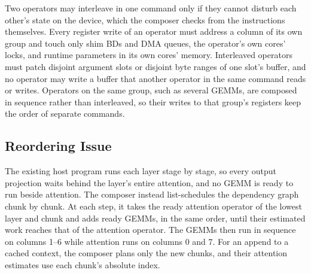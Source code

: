 Two operators may interleave in one command only if they cannot disturb each other's state on the device, which the composer checks from the instructions themselves.
Every register write of an operator must address a column of its own group and touch only shim BDs and DMA queues, the operator's own cores' locks, and runtime parameters in its own cores' memory.
Interleaved operators must patch disjoint argument slots or disjoint byte ranges of one slot's buffer, and no operator may write a buffer that another operator in the same command reads or writes.
Operators on the same group, such as several GEMMs, are composed in sequence rather than interleaved, so their writes to that group's registers keep the order of separate commands.

\subsection{Reordering Issue}
\label{subsec:order}

The existing host program runs each layer stage by stage, so every output projection waits behind the layer's entire attention, and no GEMM is ready to run beside attention.
The composer instead list-schedules the dependency graph chunk by chunk.
At each step, it takes the ready attention operator of the lowest layer and chunk and adds ready GEMMs, in the same order, until their estimated work reaches that of the attention operator.
The GEMMs then run in sequence on columns 1--6 while attention runs on columns 0 and 7.
For an append to a cached context, the composer plans only the new chunks, and their attention estimates use each chunk's absolute index.

